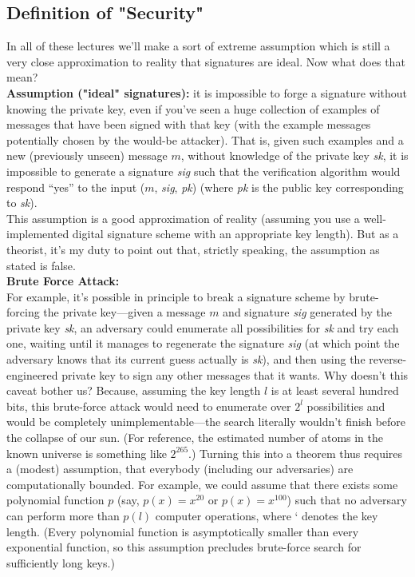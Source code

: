\subsection{Definition of "Security"}
 In all of these lectures we'll make a
sort of extreme assumption which is still a
very close approximation to reality
that signatures are ideal. Now what does that mean?\\

\noindent
\textbf{Assumption ("ideal" signatures):} it is impossible to forge a signature without knowing
the private key, even if you’ve seen a huge collection of examples of messages that have
been signed with that key (with the example messages potentially chosen by the would-be
attacker). That is, given such examples and a new (previously unseen) message $m$, without
knowledge of the private key \textit{sk}, it is impossible to generate a signature \textit{sig} such that the verification algorithm would respond “yes” to the input ($m$, \textit{sig}, \textit{pk}) (where \textit{pk} is the public key corresponding to \textit{sk}).\\

This assumption is a good approximation of reality (assuming you use a well-implemented
digital signature scheme with an appropriate key length). But as a theorist, it’s my duty
to point out that, strictly speaking, the assumption as stated is false.\\

\noindent
\textbf{Brute Force Attack:}\\
For example, it’s possible in principle to break a signature scheme by brute-forcing the
private key—given a message $m$ and signature \textit{sig} generated by the private key \textit{sk}, an
adversary could enumerate all possibilities for \textit{sk} and try each one, waiting until it manages
to regenerate the signature \textit{sig} (at which point the adversary knows that its current guess
actually is \textit{sk}), and then using the reverse-engineered private key to sign any other messages
that it wants. Why doesn’t this caveat bother us? Because, assuming the key length $l$ is at least several
hundred bits, this brute-force attack would need to enumerate over $2^l$ possibilities and would
be completely unimplementable—the search literally wouldn’t finish before the collapse of
our sun. (For reference, the estimated number of atoms in the known universe is something
like $2^{265}$.) Turning this into a theorem thus requires a (modest) assumption, that everybody (including our adversaries) are computationally bounded. For example, we could assume
that there exists some polynomial function $p$ (say, $p(x) = x^{20}$ or $p(x) = x^{100}$) such that no adversary can perform more than $p(l)$ computer operations, where ` denotes the key length. (Every polynomial function is asymptotically smaller than every exponential function, so
this assumption precludes brute-force search for sufficiently long keys.)

